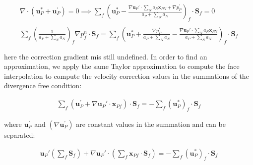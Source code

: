 \documentclass[final,3p,times,10pt,onecolumn]{myElsarticle}
\numberwithin{equation}{section}
\begin{document}
\begin{equation}\label{eq:pEqnCOMPLEX}
\begin{split}
\nabla \cdot \left(\boldsymbol{u}_P^{*} + \boldsymbol{u}_P^{'}\right) = 0 \implies
\sum_f \left(\boldsymbol{u}_P^{*} - \frac{\nabla \boldsymbol{u}_P' \cdot \sum_{N} a_{N}\boldsymbol{x}_{PN} + \nabla p_P^{'}}{a_P + \sum_{N} a_{N}}\right)_f \cdot \boldsymbol{S}_f
= 0 
\\
\\
\sum_f \left(\frac{1}{a_P + \sum_{N} a_{N}}\right)_f \nabla p_f^{n} \cdot \boldsymbol{S}_f
= \sum_f \left(\boldsymbol{u}_P^{*} + \frac{\nabla p_P^{*}}{a_P + \sum_{N} a_{N}} - \frac{\nabla \boldsymbol{u}_P' \cdot \sum_{N} a_{N}\boldsymbol{x}_{PN}}{a_P + \sum_{N} a_{N}}\right)_f \cdot \boldsymbol{S}_f
\end{split}
\end{equation}

\noindent here the correction gradient mis still undefined. In order to find an approximation, we apply the same Taylor approximation to compute the face interpolation to compute the velocity correction values in the summations of the divergence free condition:

\begin{equation}\label{eq:ugradDef1}
\begin{split}
\sum_f \left(\boldsymbol{u}_P^{'} + \nabla \boldsymbol{u}_P' \cdot \boldsymbol{x}_{Pf}\right)
\cdot
\boldsymbol{S}_f
= -\sum_f \left(\boldsymbol{u}_P^{*}\right)_f \cdot \boldsymbol{S}_f
\end{split}
\end{equation}

\noindent where $\boldsymbol{u}_P^{'}$ and $(\nabla \boldsymbol{u}_P^{'})$ are constant values in the summation and can be separated:

\begin{equation}\label{eq:ugradDef2}
\begin{split}
\boldsymbol{u}_P' \left(\sum_f \boldsymbol{S}_f\right) + \nabla \boldsymbol{u}_P' \cdot \left(\sum_f \boldsymbol{x}_{Pf} \cdot \boldsymbol{S}_f\right) = -\sum_f \left(\boldsymbol{u}_P^{*}\right)_f \cdot \boldsymbol{S}_f
\end{split}
\end{equation}
\end{document}
